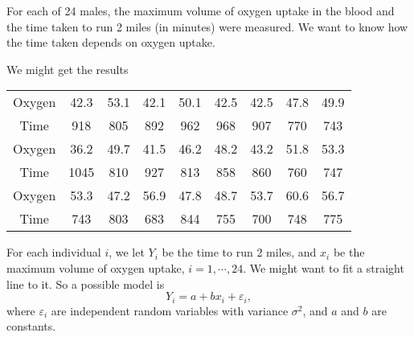 \documentclass[a4paper]{article}
\begin{document}
\begin{eg}
  For each of 24 males, the maximum volume of oxygen uptake in the blood and the time taken to run 2 miles (in minutes) were measured. We want to know how the time taken depends on oxygen uptake.

  We might get the results
  \begin{center}
    \begin{tabular}{ccccccccc}
      \toprule
      Oxygen & 42.3 & 53.1 & 42.1 & 50.1 & 42.5 & 42.5 & 47.8 & 49.9 \\
      Time & 918 & 805 & 892 & 962 & 968 & 907 & 770 & 743 \\
      \midrule
      Oxygen & 36.2 & 49.7 & 41.5 & 46.2 & 48.2 & 43.2 & 51.8 & 53.3\\
      Time & 1045 & 810 & 927 & 813 & 858 & 860 & 760 & 747\\
      \midrule
      Oxygen & 53.3 & 47.2 & 56.9 & 47.8 & 48.7 & 53.7 & 60.6 & 56.7\\
      Time & 743 & 803 & 683 & 844 & 755 & 700 & 748 & 775\\
      \bottomrule
    \end{tabular}
  \end{center}
  For each individual $i$, we let $Y_i$ be the time to run 2 miles, and $x_i$ be the maximum volume of oxygen uptake, $i = 1, \cdots, 24$. We might want to fit a straight line to it. So a possible model is
  \[
    Y_i = a + bx_i + \varepsilon_i,
  \]
  where $\varepsilon_i$ are independent random variables with variance $\sigma^2$, and $a$ and $b$ are constants.
\end{eg}
\end{document}
